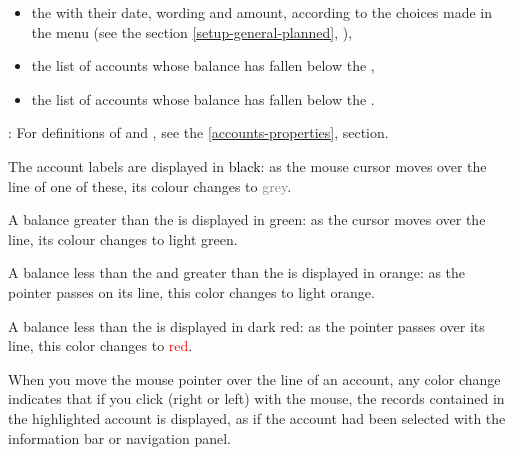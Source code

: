 \begin{itemize}
\begin{itemize}
\begin{itemize}
			\item the balance of the liability accounts and their final balance,
			\item the balance of the asset accounts and their final balance;
		\end{itemize}
	\item the  with their date, wording and amount, according to the choices made in the  menu (see the section \vref{setup-general-planned}, ),
	\item the list of accounts whose balance has fallen below the ,
	\item the list of accounts whose balance has fallen below the .
	\end{itemize}
\end{itemize}


\Note{}: For definitions of  and , see the \vref{accounts-properties},  section.


The account labels are displayed in \textcolor{black}{black}: as the mouse cursor moves over the line of one of these, its colour changes to \textcolor{gray}{grey}.

A balance greater than the  is displayed in \textcolor[RGB]{0,126,0}{green}: as the cursor moves over the line, its colour changes to \textcolor[RGB]{0,227,0}{light green}.

A balance less than the  and greater than the  is displayed in \textcolor[RGB]{230,155,0}{orange}: as the pointer passes on its line, this color changes to \textcolor[RGB]{255,200,0}{light orange}.

A balance less than the    is displayed in \textcolor[RGB]{153,0,0}{dark red}: as the pointer passes over its line, this color changes to \textcolor{red}{red}.

When you move the mouse pointer over the line of an account, any color change indicates that if you click (right or left) with the mouse, the records contained in the highlighted account is displayed, as if the account had been selected with the information bar or navigation panel.

